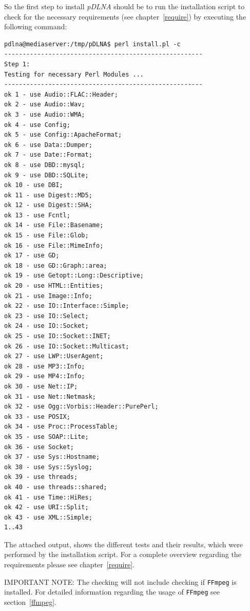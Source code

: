 \documentclass[a4paper,oneside,10pt]{report}
\newenvironment{colframecmd}{%
  \begin{Sbox}
    \begin{minipage}{.99\columnwidth}
}{%
  \end{minipage}
  \end{Sbox}
  \begin{center}
    \fcolorbox{black}{LightSteelBlue}{\TheSbox}
  \end{center}
}
\newenvironment{colframeimportantnote}{%
  \begin{Sbox}
    \begin{minipage}{.99\columnwidth}
}{%
  \end{minipage}
  \end{Sbox}
  \begin{center}
    \fcolorbox{black}{Orange}{\TheSbox}
  \end{center}
}
\begin{document}
So the first step to install {\em pDLNA} should be to run the installation script to check for the necessary requirements (see chapter~\ref{require}) by executing the following command:
\begin{colframecmd}
\begin{verbatim}
pdlna@mediaserver:/tmp/pDLNA$ perl install.pl -c
------------------------------------------------------
Step 1:
Testing for necessary Perl Modules ...
------------------------------------------------------
ok 1 - use Audio::FLAC::Header;
ok 2 - use Audio::Wav;
ok 3 - use Audio::WMA;
ok 4 - use Config;
ok 5 - use Config::ApacheFormat;
ok 6 - use Data::Dumper;
ok 7 - use Date::Format;
ok 8 - use DBD::mysql;
ok 9 - use DBD::SQLite;
ok 10 - use DBI;
ok 11 - use Digest::MD5;
ok 12 - use Digest::SHA;
ok 13 - use Fcntl;
ok 14 - use File::Basename;
ok 15 - use File::Glob;
ok 16 - use File::MimeInfo;
ok 17 - use GD;
ok 18 - use GD::Graph::area;
ok 19 - use Getopt::Long::Descriptive;
ok 20 - use HTML::Entities;
ok 21 - use Image::Info;
ok 22 - use IO::Interface::Simple;
ok 23 - use IO::Select;
ok 24 - use IO::Socket;
ok 25 - use IO::Socket::INET;
ok 26 - use IO::Socket::Multicast;
ok 27 - use LWP::UserAgent;
ok 28 - use MP3::Info;
ok 29 - use MP4::Info;
ok 30 - use Net::IP;
ok 31 - use Net::Netmask;
ok 32 - use Ogg::Vorbis::Header::PurePerl;
ok 33 - use POSIX;
ok 34 - use Proc::ProcessTable;
ok 35 - use SOAP::Lite;
ok 36 - use Socket;
ok 37 - use Sys::Hostname;
ok 38 - use Sys::Syslog;
ok 39 - use threads;
ok 40 - use threads::shared;
ok 41 - use Time::HiRes;
ok 42 - use URI::Split;
ok 43 - use XML::Simple;
1..43
\end{verbatim}
\end{colframecmd}
The attached output, shows the different tests and their results, which were performed by the installation script. For a complete overview regarding the requirements please see chapter~\ref{require}.

\begin{colframeimportantnote}
\textsc{IMPORTANT NOTE:} The checking will not include checking if \verb|FFmpeg| is installed. For detailed information regarding the usage of \verb|FFmpeg| see section~\ref{ffmpeg}.
\end{colframeimportantnote}
\end{document}
